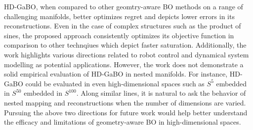 \documentclass[12pt,letterpaper]{article}
\begin{document}
HD-GaBO, when compared to other geomtry-aware BO methods on a range of challenging manifolds, better optimizes regret and depicts lower errors in its reconstructions. Even in the case of complex structures such as the product of sines, the proposed approach consistently optimizes its objective function in comparison to other technqiues which depict faster saturation. Additionally, the work highlights various directions related to robot control and dynamical system modelling as potential applications. However, the work does not demonstrate a solid empirical evaluation of HD-GaBO in nested manifolds. For instance, HD-GaBO could be evaluated in even high-dimensional spaces such as $S^{5}$ embedded in $S^{50}$ embedded in $S^{100}$. Along similar lines, it is natural to ask the behavior of nested mapping and reconstructions when the number of dimensions are varied. Pursuing the above two directions for future work would help better understand the efficacy and limitations of geometry-aware BO in high-dimensional spaces.
\end{document}
